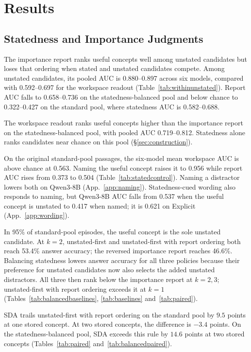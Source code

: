 \section{Results}
\label{sec:results}

\subsection{Statedness and Importance Judgments}
\label{sec:gap}

The importance report ranks useful concepts well among unstated
candidates but loses that ordering when stated and unstated candidates
compete. Among unstated candidates, its pooled AUC is 0.880--0.897
across six models, compared with 0.592--0.697 for the workspace
readout (Table~\ref{tab:withinunstated}). Report AUC falls to
0.658--0.736 on the statedness-balanced pool and below chance to
0.322--0.427 on the standard pool, where statedness AUC is
0.582--0.688.

The workspace readout ranks useful concepts higher than the importance
report on the statedness-balanced pool, with pooled AUC 0.719--0.812.
Statedness alone ranks candidates near chance on this pool
(\S\ref{sec:construction}).

On the original standard-pool passages, the six-model mean workspace
AUC is above chance at 0.563. Naming the useful concept raises it to
0.956 while report AUC rises from 0.373 to 0.504
(Table~\ref{tab:statedcontrol}). Naming a distractor lowers both on
Qwen3-8B (App.~\ref{app:naming}). Statedness-cued wording also responds
to naming, but Qwen3-8B AUC falls from 0.537 when the useful concept
is unstated to 0.417 when named; it is 0.621 on Explicit
(App.~\ref{app:wording}).

In 95\% of standard-pool episodes, the useful concept is the sole
unstated candidate. At $k=2$, unstated-first and unstated-first with
report ordering both reach 53.4\% answer accuracy; the reversed
importance report reaches 46.6\%. Balancing statedness lowers
answer accuracy for all three policies because their preference for
unstated candidates now also selects the added unstated distractors.
All three then rank below the importance report at
$k=2,3$; unstated-first with report ordering exceeds it at $k=1$
(Tables~\ref{tab:balancedbaselines}, \ref{tab:baselines}
and~\ref{tab:paired}).

SDA trails unstated-first with report ordering on the standard pool
by $9.5$ points at one stored concept. At two stored concepts, the
difference is $-3.4$ points. On the statedness-balanced pool, SDA
exceeds this rule by $14.6$ points at two stored concepts
(Tables~\ref{tab:paired} and~\ref{tab:balancedpaired}).

